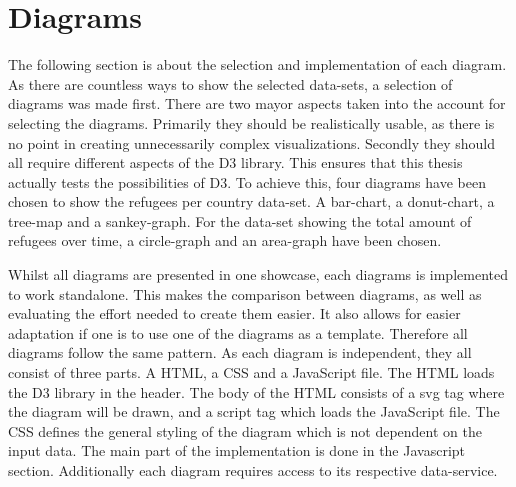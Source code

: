 



\section{Diagrams}

The following section is about the selection and implementation of each diagram. As there are countless ways to show the selected data-sets, a selection of diagrams was made first. There are two mayor aspects taken into the account for selecting the diagrams. Primarily they should be realistically usable, as there is no point in creating unnecessarily complex visualizations. Secondly they should all require different aspects of the D3 library. This ensures that this thesis actually tests the possibilities of D3. To achieve this, four diagrams have been chosen to show the refugees per country data-set. A bar-chart, a donut-chart, a tree-map and a sankey-graph. For the data-set showing the total amount of refugees over time, a circle-graph and an area-graph have been chosen.

Whilst all diagrams are presented in one showcase, each diagrams is implemented to work standalone. This makes the comparison between diagrams, as well as evaluating the effort needed to create them easier. It also allows for easier adaptation if one is to use one of the diagrams as a template. Therefore all diagrams follow the same pattern. As each diagram is independent, they all consist of three parts. A HTML, a CSS and a JavaScript file. The HTML loads the D3 library in the header. The body of the HTML consists of a svg tag where the diagram will be drawn, and a script tag which loads the JavaScript file. The CSS defines the general styling of the diagram which is not dependent on the input data. The main part of the implementation is done in the Javascript section. Additionally each diagram requires access to its respective data-service.

